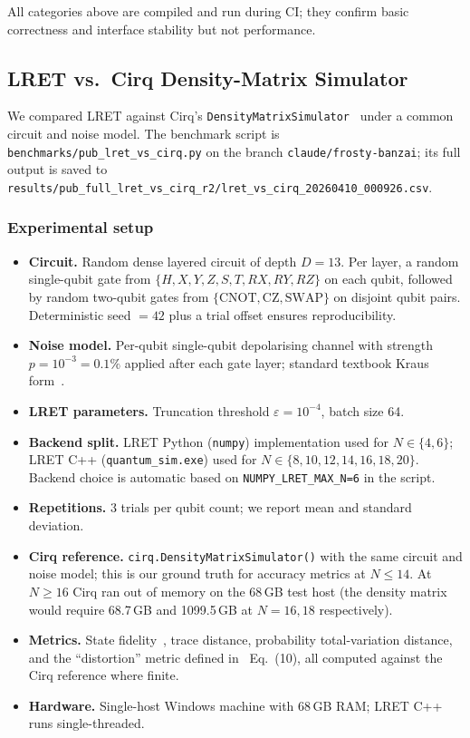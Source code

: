 \documentclass[11pt,a4paper]{article}
\begin{document}
All categories above are compiled and run during CI; they confirm basic correctness
and interface stability but not performance.

\subsection{LRET vs.\ Cirq Density-Matrix Simulator}
\label{sec:bench}

We compared LRET against Cirq's \texttt{DensityMatrixSimulator}~\cite{cirq} under a
common circuit and noise model. The benchmark script is
\texttt{benchmarks/pub\_lret\_vs\_cirq.py} on the branch
\texttt{claude/frosty-banzai}; its full output is saved to
\texttt{results/pub\_full\_lret\_vs\_cirq\_r2/lret\_vs\_cirq\_20260410\_000926.csv}.

\subsubsection*{Experimental setup}

\begin{itemize}
  \item \textbf{Circuit.} Random dense layered circuit of depth $D = 13$. Per layer,
        a random single-qubit gate from $\{H, X, Y, Z, S, T, RX, RY, RZ\}$ on each
        qubit, followed by random two-qubit gates from $\{\text{CNOT}, \text{CZ},
        \text{SWAP}\}$ on disjoint qubit pairs. Deterministic seed $=42$ plus a
        trial offset ensures reproducibility.
  \item \textbf{Noise model.} Per-qubit single-qubit depolarising channel
        with strength $p = 10^{-3} = 0.1\%$ applied after each gate layer;
        standard textbook Kraus form~\cite{nielsenchuang2010}.
  \item \textbf{LRET parameters.} Truncation threshold $\varepsilon = 10^{-4}$,
        batch size 64.
  \item \textbf{Backend split.} LRET Python (\texttt{numpy}) implementation used for
        $N \in \{4,6\}$; LRET C++ (\texttt{quantum\_sim.exe}) used for
        $N \in \{8,10,12,14,16,18,20\}$. Backend choice is automatic based on
        \texttt{NUMPY\_LRET\_MAX\_N=6} in the script.
  \item \textbf{Repetitions.} 3 trials per qubit count; we report mean and standard
        deviation.
  \item \textbf{Cirq reference.} \texttt{cirq.DensityMatrixSimulator()} with the same
        circuit and noise model; this is our ground truth for accuracy metrics at
        $N \le 14$. At $N \ge 16$ Cirq ran out of memory on the 68\,GB test host
        (the density matrix would require 68.7\,GB and 1099.5\,GB at $N=16,18$
        respectively).
  \item \textbf{Metrics.} State fidelity~\cite{nielsenchuang2010}, trace distance,
        probability total-variation distance, and the ``distortion'' metric defined
        in~\cite{chen2021lret} Eq.\ (10), all computed against the Cirq reference
        where finite.
  \item \textbf{Hardware.} Single-host Windows machine with 68\,GB RAM; LRET C++
        runs single-threaded.
\end{itemize}
\end{document}
